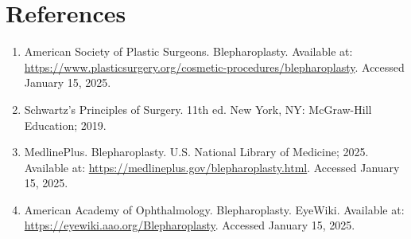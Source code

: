 \section*{References}
\begin{enumerate}
  \item American Society of Plastic Surgeons. Blepharoplasty. Available at: \url{https://www.plasticsurgery.org/cosmetic-procedures/blepharoplasty}. Accessed January 15, 2025.
  \item Schwartz's Principles of Surgery. 11th ed. New York, NY: McGraw-Hill Education; 2019.
  \item MedlinePlus. Blepharoplasty. U.S. National Library of Medicine; 2025. Available at: \url{https://medlineplus.gov/blepharoplasty.html}. Accessed January 15, 2025.
  \item American Academy of Ophthalmology. Blepharoplasty. EyeWiki. Available at: \url{https://eyewiki.aao.org/Blepharoplasty}. Accessed January 15, 2025.
\end{enumerate}

\clearpage
